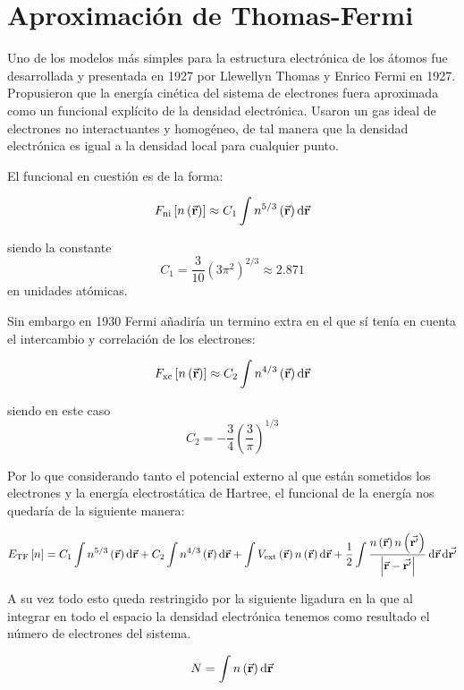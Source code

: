 \section{Aproximación de Thomas-Fermi}

Uno de los modelos más simples para la estructura electrónica de los átomos fue desarrollada y presentada en 1927 por Llewellyn Thomas y Enrico Fermi en 1927. Propusieron que la energía cinética del sistema de electrones fuera aproximada como un funcional explícito de la densidad electrónica. Usaron un gas ideal de electrones no interactuantes y homogéneo, de tal manera que la densidad electrónica es igual a la densidad local para cualquier punto.

El funcional en cuestión es de la forma:

\begin{equation}
    F_{\text{ni}} \left[ n \left( \va{r} \right) \right] \approx C_1 \int n^{5/3} \left( \va{r} \right) \dd{\va{r}}
\end{equation}

siendo la constante \begin{equation}
    C_1 = \frac{3}{10} (3 \pi^2)^{2/3} \approx 2.871
\end{equation} en unidades atómicas.

Sin embargo en 1930 Fermi añadiría un termino extra en el que sí tenía en cuenta el intercambio y correlación de los electrones:

\begin{equation}
    F_{\text{xc}}\left[ n \left( \va{r} \right) \right] \approx C_2 \int n^{4/3} \left( \va{r} \right) \dd{\va{r}}
\end{equation}

siendo en este caso \begin{equation}
    C_2 = - \frac{3}{4} \left( \frac{3}{\pi} \right)^{1/3}
\end{equation}

Por lo que considerando tanto el potencial externo al que están sometidos los electrones y la energía electrostática de Hartree, el funcional de la energía nos quedaría de la siguiente manera:

\begin{equation}
    E_{\text{TF}} \left[ n \right] = C_1 \int n^{5/3} \left( \va{r} \right) \dd{\va{r}} + C_2 \int n^{4/3} \left( \va{r} \right) \dd{\va{r}} + \int V_{\text{ext}} \left( \va{r} \right) n \left( \va{r} \right) \dd{\va{r}}  + \frac{1}{2} \int \frac{n \left( \va{r} \right) n \left( \va{r'} \right)}{\abs{ \va{r} - \va{r'} } } \dd{\va{r}} \dd{\va{r'}}
\end{equation}

A su vez todo esto queda restringido por la siguiente ligadura en la que al integrar en todo el espacio la densidad electrónica tenemos como resultado el número de electrones del sistema.

\begin{equation}
    N = \int n \left( \va{r} \right)  \dd{\va{r}}
\end{equation}
